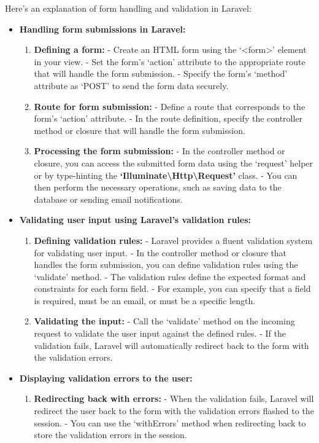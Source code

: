 \medskip Here's an explanation of form handling and validation in Laravel:
\begin{itemize}
    \item \textbf{Handling form submissions in Laravel:}
\begin{enumerate} 
    \item \textbf{Defining a form:}
   - Create an HTML form using the `\textless form\textgreater' element in your view.
   - Set the form's `action' attribute to the appropriate route that will handle the form submission.
   - Specify the form's `method' attribute as `POST' to send the form data securely.

   \item \textbf{Route for form submission:}
   - Define a route that corresponds to the form's `action' attribute.
   - In the route definition, specify the controller method or closure that will handle the form submission.

   \item \textbf{Processing the form submission:}
   - In the controller method or closure, you can access the submitted form data using the `request' helper or by type-hinting the \textbf{`Illuminate\textbackslash Http\textbackslash Request'} class.
   - You can then perform the necessary operations, such as saving data to the database or sending email notifications.
\end{enumerate} 
   \item \textbf{Validating user input using Laravel's validation rules:}
   \begin{enumerate}
    \item \textbf{Defining validation rules:}
   - Laravel provides a fluent validation system for validating user input.
   - In the controller method or closure that handles the form submission, you can define validation rules using the `validate' method.
   - The validation rules define the expected format and constraints for each form field.
   - For example, you can specify that a field is required, must be an email, or must be a specific length.

   \item \textbf{Validating the input:}
   - Call the `validate' method on the incoming request to validate the user input against the defined rules.
   - If the validation fails, Laravel will automatically redirect back to the form with the validation errors.
\end{enumerate} 
   \item \textbf{Displaying validation errors to the user:}
   \begin{enumerate}
    \item \textbf{Redirecting back with errors:}
   - When the validation fails, Laravel will redirect the user back to the form with the validation errors flashed to the session.
   - You can use the `withErrors' method when redirecting back to store the validation errors in the session.


\end{enumerate}
\end{itemize}
